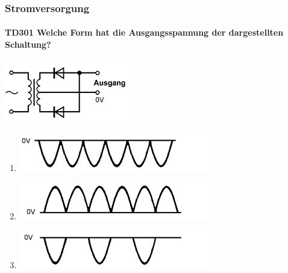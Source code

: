 \documentclass[8pt]{article}
\begin{document}
\begin{enumerate}
\begin{enumerate}[nolistsep,label=\Alph*]
{\pagebreak
\subsubsection{Stromversorgung}
\paragraph*{TD301 Welche Form hat die Ausgangsspannung der dargestellten Schaltung?}
\begin{center}
	\begin{minipage}{\linewidth}
		\centering
		\includegraphics[scale=1.0]{pics/td301_a.jpg}
	\end{minipage}
\end{center}
\begin{enumerate}[nolistsep,label=\Alph*]
\item
\begin{center}
	\begin{minipage}{\linewidth}
		\centering
		\includegraphics[scale=1.0]{pics/td301_b.jpg}
	\end{minipage}
\end{center}
\item
\begin{center}
	\begin{minipage}{\linewidth}
		\centering
		\includegraphics[scale=1.0]{pics/td301_c.jpg}
	\end{minipage}
\end{center}
\item
\begin{center}
	\begin{minipage}{\linewidth}
		\centering
		\includegraphics[scale=1.0]{pics/td301_d.jpg}

\end{minipage}
\end{center}
\end{enumerate}}
\end{enumerate}
\end{enumerate}
\end{document}
